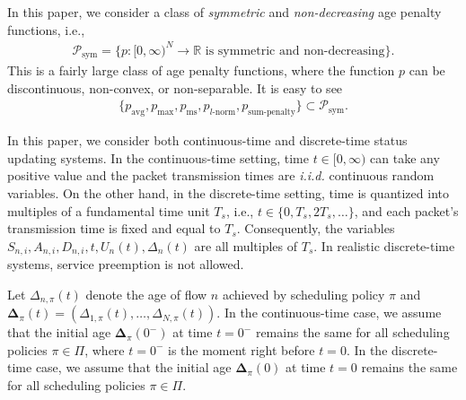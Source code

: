 \begin{itemize}

\end{itemize}

In this paper, we consider a class of \emph{symmetric} and \emph{non-decreasing} age penalty functions, i.e.,
\begin{align}%
\mathcal{P}_{\text{sym}}
\!=\!\{p: [0,\infty)^N\rightarrow \mathbb{R}  \text{ is symmetric and non-decreasing}\}.\nonumber
\end{align}
This is a fairly large class of age penalty functions, where the function $p$ can be discontinuous, non-convex, or non-separable.
It is easy to see 
\begin{align}
\{p_{\text{avg}},p_{\max}, p_{\text{ms}},p_{\text{$l$-norm}}, %
p_{\text{sum-penalty}}\}\subset \mathcal{P}_{\text{sym}}.
\end{align}

In this paper, we consider both continuous-time and discrete-time  status updating systems. In the continuous-time setting, time $t \in [0,\infty)$ can take any positive value and the packet transmission times are \emph{i.i.d.} continuous random variables. On the other hand, in the discrete-time setting, time is quantized into multiples of a fundamental time unit $T_s$, i.e., $t \in \{0, T_s, 2T_s, \ldots\}$, and each packet's transmission time is fixed and equal to $T_s$. Consequently, the variables $S_{n,i}, A_{n,i}, D_{n,i}, t, U_{n} (t), \Delta_{n} (t)$ are all multiples of $T_s$. In realistic discrete-time systems, service preemption is not allowed. 


Let ${\Delta}_{n,\pi}(t)$ denote the age of flow $n$ achieved by scheduling policy $\pi$ 
and $\bm{\Delta}_{\pi}(t) = (\Delta_{1,\pi} (t),\ldots,\Delta_{N,\pi} (t))$. 
In the continuous-time case, we assume that the initial age $\bm\Delta_{\pi}(0^-)$ at time $t=0^-$ remains the same for all scheduling policies $\pi\in\Pi$, where $t=0^-$ is the moment right before $t=0$. In the discrete-time case, we assume that the initial age $\bm\Delta_{\pi}(0)$ at time $t=0$ remains the same for all scheduling policies $\pi\in\Pi$. 

